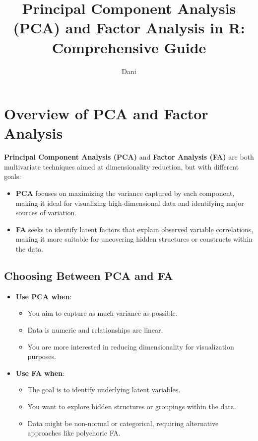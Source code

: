 \documentclass{article}
\title{Principal Component Analysis (PCA) and Factor Analysis in R: Comprehensive Guide}
\author{Dani}
\date{}
\begin{document}
\maketitle

\section{Overview of PCA and Factor Analysis}
\textbf{Principal Component Analysis (PCA)} and \textbf{Factor Analysis (FA)} are both multivariate techniques aimed at dimensionality reduction, but with different goals:
\begin{itemize}
    \item \textbf{PCA} focuses on maximizing the variance captured by each component, making it ideal for visualizing high-dimensional data and identifying major sources of variation.
    \item \textbf{FA} seeks to identify latent factors that explain observed variable correlations, making it more suitable for uncovering hidden structures or constructs within the data.
\end{itemize}

\subsection{Choosing Between PCA and FA}
\begin{itemize}
    \item \textbf{Use PCA when}:
        \begin{itemize}
            \item You aim to capture as much variance as possible.
            \item Data is numeric and relationships are linear.
            \item You are more interested in reducing dimensionality for visualization purposes.
        \end{itemize}
    \item \textbf{Use FA when}:
        \begin{itemize}
            \item The goal is to identify underlying latent variables.
            \item You want to explore hidden structures or groupings within the data.
            \item Data might be non-normal or categorical, requiring alternative approaches like polychoric FA.
        \end{itemize}
\end{itemize}
\end{document}
